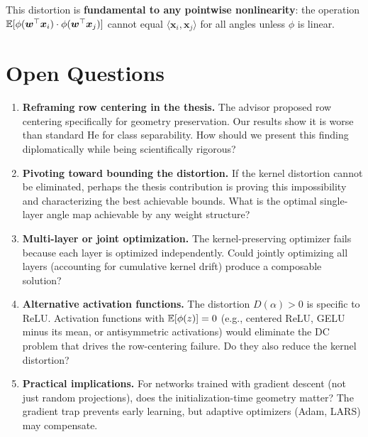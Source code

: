 This distortion is \textbf{fundamental to any pointwise nonlinearity}:
the operation
$\mathbb{E}[\phi(\bm{w}^\top \bm{x}_i) \cdot \phi(\bm{w}^\top \bm{x}_j)]$
cannot equal $\langle \bm{x}_i, \bm{x}_j \rangle$ for all angles
unless $\phi$ is linear.

\section{Open Questions}

\begin{enumerate}
  \item \textbf{Reframing row centering in the thesis.}
        The advisor proposed row centering specifically for geometry
        preservation.  Our results show it is worse than standard He
        for class separability.  How should we present this finding
        diplomatically while being scientifically rigorous?

  \item \textbf{Pivoting toward bounding the distortion.}
        If the kernel distortion cannot be eliminated, perhaps the
        thesis contribution is proving this impossibility and
        characterizing the best achievable bounds.  What is the
        optimal single-layer angle map achievable by any weight
        structure?

  \item \textbf{Multi-layer or joint optimization.}
        The kernel-preserving optimizer fails because each layer is
        optimized independently.  Could jointly optimizing all layers
        (accounting for cumulative kernel drift) produce a composable
        solution?

  \item \textbf{Alternative activation functions.}
        The distortion $D(\alpha) > 0$ is specific to ReLU.
        Activation functions with $\mathbb{E}[\phi(z)] = 0$ (e.g., centered
        ReLU, GELU minus its mean, or antisymmetric activations) would
        eliminate the DC problem that drives the row-centering failure.
        Do they also reduce the kernel distortion?

  \item \textbf{Practical implications.}
        For networks trained with gradient descent (not just random
        projections), does the initialization-time geometry matter?
        The gradient trap prevents early learning, but adaptive
        optimizers (Adam, LARS) may compensate.
\end{enumerate}
